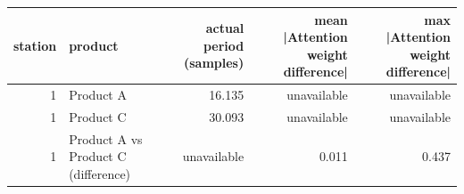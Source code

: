 \begin{tabular}{rlrrr}
\toprule
station & product & actual period (samples) & mean |Attention weight difference| & max |Attention weight difference| \\
\midrule
1 & Product A & 16.135 & unavailable & unavailable \\
1 & Product C & 30.093 & unavailable & unavailable \\
1 & Product A vs Product C (difference) & unavailable & 0.011 & 0.437 \\
\bottomrule
\end{tabular}
